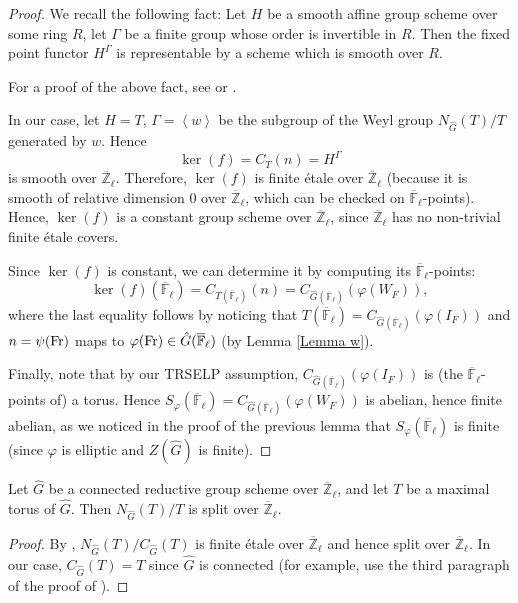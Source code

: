 \begin{proof}
	We recall the following fact: Let $H$ be a smooth affine group scheme over some ring $R$, let $\Gamma$ be a finite group whose order is invertible in $R$. Then the fixed point functor $H^{\Gamma}$ is representable by a scheme which is smooth over $R$.
	
	For a proof of the above fact, see \cite[Proposition 3.4]{edixhoven1992neron} or \cite[Lemma A.1, A.13]{dhkm2020moduli}.
	
	In our case, let $H=T$, $\Gamma=\left<w\right>$ be the subgroup of the Weyl group $N_{\hat{G}}(T)/T$ generated by $w$. Hence $$\ker(f)=C_T(n)=H^{\Gamma}$$
    is smooth over $\overline{\mathbb{Z}}_{\ell}$. Therefore, $\ker(f)$ is finite étale over $\overline{\mathbb{Z}}_{\ell}$ (because it is smooth of relative dimension $0$ over $\overline{\mathbb{Z}}_{\ell}$, which can be checked on $\overline{\mathbb{F}}_{\ell}$-points). Hence, $\ker(f)$ is a constant group scheme over $\overline{\mathbb{Z}}_{\ell}$, since $\overline{\mathbb{Z}}_{\ell}$ has no non-trivial finite étale covers.
	
	Since $\ker(f)$ is constant, we can determine it by computing its $\overline{\mathbb{F}}_{\ell}$-points:
	\begin{equation}\label{Eq ker(f)}
	\ker(f)(\overline{\mathbb{F}}_{\ell})=C_{T(\overline{\mathbb{F}}_{\ell})}(n)=C_{\hat{G}(\overline{\mathbb{F}}_{\ell})}(\varphi(W_F)),
	\end{equation}
	where the last equality follows by noticing that $T(\overline{\mathbb{F}}_{\ell})=C_{\hat{G}(\overline{\mathbb{F}}_{\ell})}(\varphi(I_F))$ and $n=\psi(\operatorname{Fr})$ maps to $\varphi(\operatorname{Fr}) \in \hat{G}(\overline{\mathbb{F}}_{\ell})$ (by Lemma \ref{Lemma w}).
	
	Finally, note that by our TRSELP assumption, $C_{\hat{G}(\overline{\mathbb{F}}_{\ell})}(\varphi(I_F))$ is (the $\overline{\mathbb{F}}_{\ell}$-points of) a torus. Hence $S_{\varphi}(\overline{\mathbb{F}}_{\ell})=C_{\hat{G}(\overline{\mathbb{F}}_{\ell})}(\varphi(W_F))$ is abelian, hence finite abelian, as we noticed in the proof of the previous lemma that $S_\varphi(\overline{\mathbb{F}}_{\ell})$ is finite (since $\varphi$ is elliptic and $Z(\hat{G})$ is finite).
\end{proof}

\begin{lemma}\label{Lem Wely}
	Let $\hat{G}$ be a connected reductive group scheme over $\overline{\mathbb{Z}}_{\ell}$, and let $T$ be a maximal torus of $\hat{G}$. Then $N_{\hat{G}}(T)/T$ is split over $\overline{\mathbb{Z}}_{\ell}$.
\end{lemma}

\begin{proof}
	By \cite[Proposition 3.2.8]{conrad2014reductive}, $N_{\hat{G}}(T)/C_{\hat{G}}(T)$ is finite étale over $\overline{\mathbb{Z}}_{\ell}$ and hence split over $\overline{\mathbb{Z}}_{\ell}$. In our case, $C_{\hat{G}}(T)=T$ since $\hat{G}$ is connected (for example, use the third paragraph of the proof of \cite[Proposition 3.1.12]{conrad2014reductive}).
\end{proof}
	

